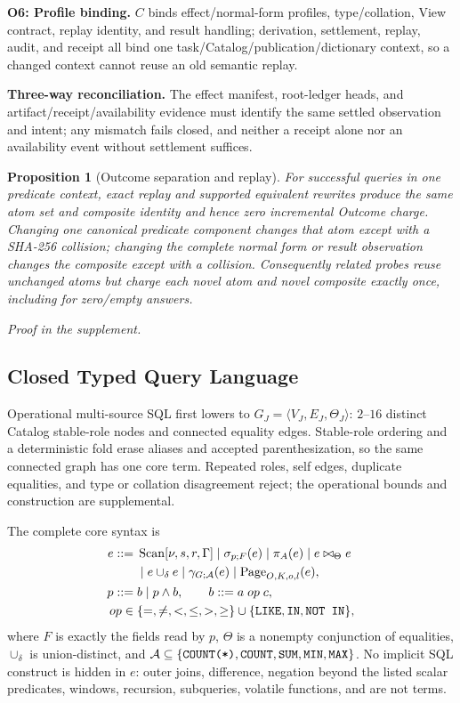 \documentclass[10pt,journal,compsoc]{IEEEtran}
\newcommand{\code}[1]{\texttt{\detokenize{#1}}}
\newtheorem{proposition}{Proposition}
\begin{document}
\textbf{O6: Profile binding.} $C$ binds effect/normal-form profiles,
type/collation, View contract, replay identity, and result handling;
derivation, settlement, replay, audit, and receipt all bind one
task/Catalog/publication/dictionary context, so a changed context cannot
reuse an old semantic replay.

\textbf{Three-way reconciliation.} The effect manifest, root-ledger heads,
and artifact/receipt/availability evidence must identify the same settled
observation and intent; any mismatch fails closed, and neither a receipt
alone nor an availability event without settlement suffices.

\begin{proposition}[Outcome separation and replay]
\label{thm:outcome-separation}
For successful queries in one predicate context, exact replay and supported
equivalent rewrites produce the same atom set and composite identity and hence
zero incremental Outcome charge. Changing one canonical predicate component
changes that atom except with a SHA-256 collision; changing the complete normal
form or result observation changes the composite except with a collision.
Consequently related probes reuse unchanged atoms but charge each novel atom
and novel composite exactly once, including for zero/empty answers.
\end{proposition}
\emph{Proof in the supplement.}

\subsection{Closed Typed Query Language}

Operational multi-source SQL first lowers to
$G_J=\langle V_J,E_J,\Theta_J\rangle$: $2$--$16$ distinct Catalog stable-role
nodes and connected equality edges. Stable-role ordering and a deterministic
fold erase aliases and accepted parenthesization, so the same connected graph
has one core term. Repeated roles, self edges, duplicate equalities, and type or
collation disagreement reject; the operational bounds and construction are
supplemental.

The complete core syntax is
\begin{align*}
e ::= {}& \operatorname{Scan}[\nu,s,r,\Gamma]
 \mid \sigma_{p;F}(e) \mid \pi_A(e) \mid e\bowtie_{\Theta}e \\
 &\mid e\cup_\delta e \mid \gamma_{G;\mathcal A}(e)
 \mid \operatorname{Page}_{O,K,o,l}(e),\\
p ::= {}& b \mid p\wedge b,\qquad b ::= a\;op\;c,\\
op\in {}&\{=,\ne,<,\le,>,\ge\}
 \cup\{\code{LIKE},\code{IN},\code{NOT IN}\},
\end{align*}
where $F$ is exactly the fields read by $p$, $\Theta$ is a nonempty
conjunction of equalities, $\cup_\delta$ is union-distinct, and
$\mathcal A\subseteq\{\code{COUNT(*)},\code{COUNT},\code{SUM},\code{MIN},
\code{MAX}\}$.  No implicit SQL construct is hidden in $e$: outer joins,
difference, negation beyond the listed scalar predicates, windows, recursion,
subqueries, volatile functions, and \code{UNION ALL} are not terms.
\end{document}
